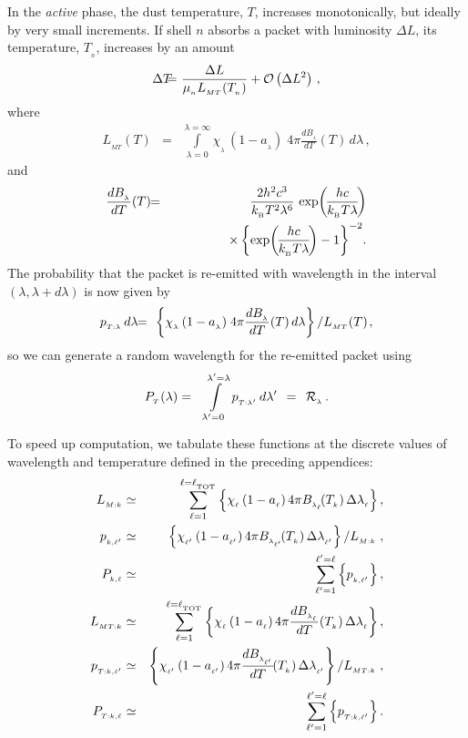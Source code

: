 \documentclass[usenatbib]{mn2e}
\numberwithin{equation}{section}
\begin{document}
In the {\it active} phase, the dust temperature, $T$, increases monotonically, but ideally by very small increments. If shell $n$ absorbs a packet with luminosity $\Delta L$, its temperature, $T_{_n}$, increases by an amount
\begin{eqnarray}
\Delta T\!\!&\!\!=\!\!&\!\!\frac{\Delta L}{\mu_{_n}L_{_{MT}}(T_{_n})}+{\cal O}\left(\Delta L^2\right)\,,
\end{eqnarray}
where 
\begin{eqnarray}
L_{_{MT}}(T)&=&\int\limits_{\lambda=0}^{\lambda=\infty} \chi_{_\lambda}\,(1-a_{_\lambda})\;4\pi \frac{dB_{_\lambda}}{dT}(T)\,d\lambda\,,
\end{eqnarray}
and
\begin{eqnarray}\nonumber
\frac{dB_{_\lambda}}{dT}(T)\!&\!=\!&\!\frac{2h^2c^3}{k_{_{\rm B}}T^2\lambda^6}\,\exp\!\left(\!\frac{hc}{k_{_{\rm B}}T\lambda}\!\right)\\
&&\hspace{1.6cm}\times\left\{\exp\!\left(\!\frac{hc}{k_{_{\rm B}}T\lambda}\!\right)-1\right\}^{-2}\!.
\end{eqnarray}
The probability that the packet is re-emitted with wavelength in the interval $(\lambda,\lambda+d\lambda)$ is now given by
\begin{eqnarray}
p_{_{T:\lambda}}\,d\lambda\!&\!=\!&\!\left\{\chi_{_\lambda}\,(1-a_{_\lambda})\;4\pi \frac{dB_{_\lambda}}{dT}(T)\,d\lambda\right\}\left/L_{_{MT}}(T)\right.\!,
\end{eqnarray}
so we can generate a random wavelength for the re-emitted packet using
\begin{eqnarray}\nonumber
P_{_T}(\lambda)&=&\int\limits_{\lambda'=0}^{\lambda'=\lambda}\,p_{_{T:\lambda'}}\,d\lambda'\;\,=\;\,{\cal R}_{_\lambda}\,.
\end{eqnarray}

To speed up computation, we tabulate these functions at the discrete values of wavelength and temperature defined in the preceding appendices:
\begin{eqnarray}
L_{_{M:k}}&\simeq&\sum\limits_{\ell =1}^{\ell=\ell_{_{\rm TOT}}}\left\{\chi_{_\ell}\,(1-a_{_\ell})\,4\pi B_{_{\lambda_\ell}}\!(T_{_k})\,\Delta\lambda_{_\ell}\right\},\\\nonumber
p_{_{k,\ell'}}&\simeq&\left\{\chi_{_{\ell'}}\,(1-a_{_{\ell'}})\,4\pi B_{_{\lambda_{\ell'}}}\!(T_{_k})\,\Delta\lambda_{_{\ell'}}\right\}\left/L_{_{M:k}}\right.,\\
P_{_{k,\ell}}&\simeq&\sum\limits_{\ell'=1}^{\ell'=\ell}\left\{p_{_{k,\ell'}}\right\},\\
L_{_{MT:k}}&\simeq&\sum\limits_{\ell =1}^{\ell=\ell_{_{\rm TOT}}}\left\{\chi_{_\ell}\,(1-a_{_\ell})\,4\pi \frac{dB_{_{\lambda_\ell}}}{dT}(T_{_k})\,\Delta\lambda_{_\ell}\right\},\\\nonumber
p_{_{T:k,\ell'}}&\simeq&\left\{\chi_{_{\ell'}}\,(1-a_{_{\ell'}})\,4\pi \frac{dB_{_{\lambda_{\ell'}}}}{dT}\!(T_{_k})\,\Delta\lambda_{_{\ell'}}\right\}\left/L_{_{MT:k}}\right.,\\
P_{_{T:k,\ell}}&\simeq&\sum\limits_{\ell'=1}^{\ell'=\ell}\left\{p_{_{T:k,\ell'}}\right\}.
\end{eqnarray}
\end{document}
